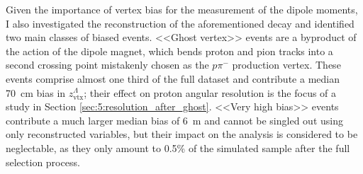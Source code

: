 Given the importance of \lambdadecay vertex bias for the measurement of the \lz dipole moments, I also investigated the reconstruction of the aforementioned decay and identified two main classes of biased events.
<<Ghost vertex>> events are a byproduct of the action of the dipole magnet, which bends proton and pion tracks into a second crossing point mistakenly chosen as the $p\pi^-$ production vertex.
These events comprise almost one third of the full dataset and contribute a median \SI{70}{\centi\meter} bias in $z_\text{vtx}^\Lambda$;
their effect on proton angular resolution is the focus of a study in Section \ref{sec:5:resolution_after_ghost}.
<<Very high bias>> events contribute a much larger median bias of \SI{6}{\meter} and cannot be singled out using only reconstructed variables, but their impact on the \demonstratorshort analysis is considered to be neglectable, as they only amount to 0.5\% of the simulated sample after the full selection process.